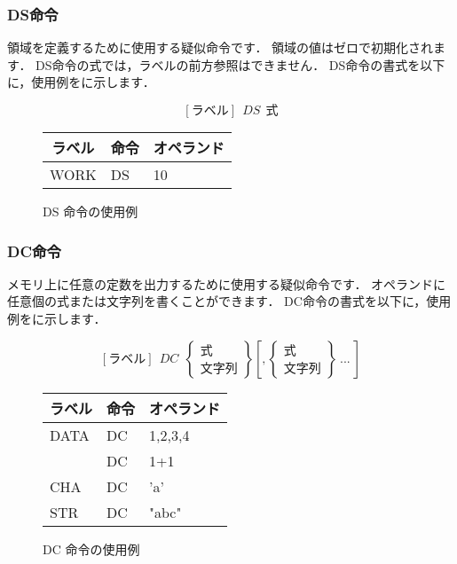 \subsubsection{DS命令}
領域を定義するために使用する疑似命令です．
領域の値はゼロで初期化されます．
DS命令の式では，ラベルの前方参照はできません．
DS命令の書式を以下に，使用例をに示します．

{\small\[ [ラベル]~~DS~~式 \]}

\begin{figure}[btp]
\begin{center}
{\tt\small\begin{tabular}{|l|l|l|}\hline
\multicolumn{1}{|c|}{ラベル} & 
        \multicolumn{1}{c|}{命令} & \multicolumn{1}{c|}{オペランド} \\\hline
WORK & DS & 10 \\\hline
\end{tabular}}
\caption{DS 命令の使用例}
\label{fig:appB:ds}
\end{center}
\end{figure}

\subsubsection{DC命令}
メモリ上に任意の定数を出力するために使用する疑似命令です．
オペランドに任意個の式または文字列を書くことができます．
DC命令の書式を以下に，使用例をに示します．

{\small\[ %
[ラベル]~~DC~~\left\{
  \begin{array}{c}
   式 \\
   文字列
  \end{array}
 \right\}
[,\left\{
  \begin{array}{c}
   式 \\
   文字列
  \end{array}  
 \right\} ~ ... ~
]
\]}

\begin{figure}[btp]
\begin{center}
{\tt\small\begin{tabular}{|l|l|l|}\hline
\multicolumn{1}{|c|}{ラベル} & 
        \multicolumn{1}{c|}{命令} & \multicolumn{1}{c|}{オペランド} \\\hline
DATA & DC & 1,2,3,4 \\
     & DC & 1+1 \\
CHA  & DC & 'a' \\
STR  & DC & "abc" \\\hline
\end{tabular}}
\caption{DC 命令の使用例}
\label{fig:appB:dc}
\end{center}
\end{figure}

